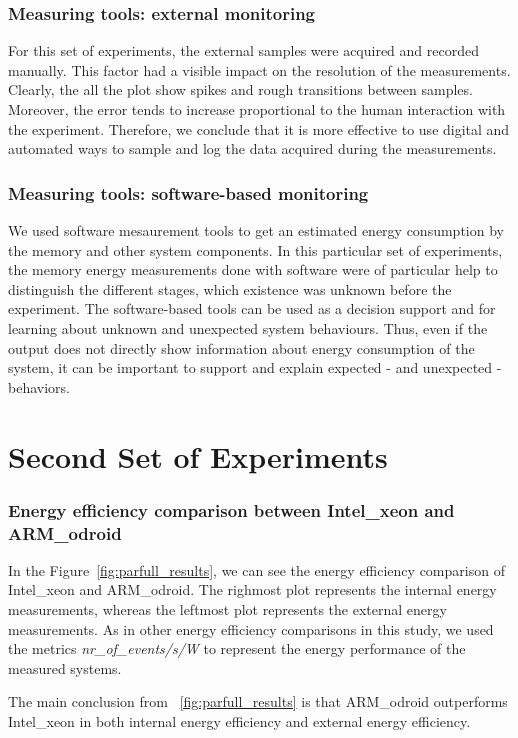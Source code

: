 \subsubsection*{Measuring tools: external monitoring}
For this set of experiments, the external samples were acquired and recorded 
manually. This factor had a visible impact on the resolution of the measurements. Clearly,
the all the plot show spikes and rough transitions between samples. Moreover, the error
tends to increase proportional to the human interaction with the experiment. 
Therefore, we conclude that it is more effective to use digital and automated ways to sample and
log the data acquired during the measurements.

\subsubsection*{Measuring tools: software-based monitoring}
We used software mesaurement tools to get an estimated energy consumption by the memory and other system components. In this particular set of experiments, the memory energy measurements done with software were
of particular help to distinguish the different stages, which existence was
unknown before the experiment. The software-based tools can be used as a 
decision support and for learning about unknown and unexpected system behaviours. Thus, even if the output
does not directly show information about energy consumption of the system, it
can be important to support and explain expected - and unexpected - behaviors.
  

\section{Second Set of Experiments}
\subsubsection*{Energy efficiency comparison between Intel\_xeon and ARM\_odroid}

In the Figure~\ref{fig:parfull_results}, we can see the energy efficiency comparison of Intel\_xeon and ARM\_odroid. The righmost plot represents the internal energy measurements, whereas the leftmost plot represents the external energy measurements. As in other energy efficiency comparisons in this study, we used the metrics \textit{nr\_of\_events/s/W} to represent the energy performance of the measured systems. 

The main conclusion from ~\ref{fig:parfull_results} is that ARM\_odroid outperforms Intel\_xeon in both internal energy efficiency and external energy efficiency.

